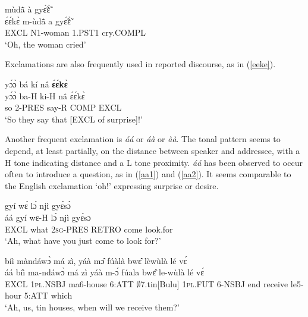\begin{exe} 
\ex\label{eeke1}
   mùdã̂ à gyɛ̃́ɛ̃̀ \\
        ɛ́ɛ́kɛ̀ m-ùdã̂ a gyɛ̃́ɛ̃̀ \\
          EXCL N1-woman 1.PST1 cry.COMPL \\
    \trans `Oh, the woman cried'
\end{exe}


Exclamations are also frequently used in reported discourse, as in (\ref{eeke}).

\begin{exe} 
\ex\label{eeke}
  \glll  yɔ́ɔ̀ bá kí nâ {\bfseries ɛ́ɛ́kɛ̀} \\
            yɔ́ɔ̀ ba-H ki-H nâ ɛ́ɛ́kɛ̀ \\
         so 2-PRES say-R COMP EXCL \\
    \trans `So they say that [EXCL of surprise]!'
\end{exe}

Another frequent exclamation is {\itshape áá} or {\itshape áà} or {\itshape àà}. The tonal pattern seems to depend, at least partially,  on the distance between speaker and addressee, with a H tone indicating distance and a L tone proximity. {\itshape áá} has been observed to occur often to introduce a question, as in (\ref{aa1}) and (\ref{aa2}). It seems comparable to the English exclamation `oh!' expressing surprise or desire.

\begin{exe} 
\ex\label{aa1}
   gyí wɛ́ lɔ́ njì gyɛ́sɔ̀ \\
        áá gyí wɛ-H lɔ́ njì gyɛ́sɔ \\
           EXCL what 2\textsc{sg}-PRES RETRO come look.for  \\
    \trans `Ah, what have you just come to look for?'
\end{exe}

\begin{exe} 
\ex\label{aa2}
   bíì màndáwɔ̀ má zì, yáà mɔ̂ fúàlà bwɛ̂ lèwùlà lé vɛ́\\
          áá bíì ma-ndáwɔ̀ má zì yáà m-ɔ́ fúala bwɛ̂ le-wùlà lé vɛ́\\
              EXCL 1\textsc{pl}.NSBJ ma6-house 6:ATT $\emptyset$7.tin[Bulu] 1\textsc{pl}.FUT 6-NSBJ end receive le5-hour 5:ATT which \\
    \trans `Ah, us, tin houses, when will we receive them?'
\end{exe}

